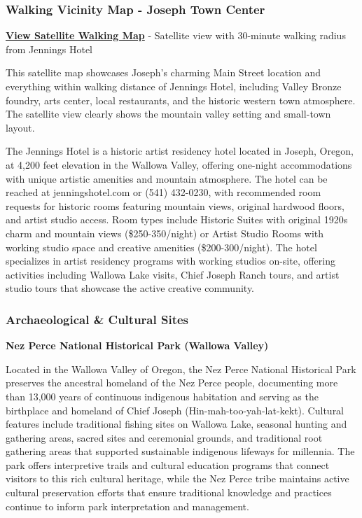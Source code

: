 \documentclass[
  11pt,
  letterpaper,
  DIV=10,
  numbers=noendperiod]{scrartcl}
\begin{document}
\subsubsection{Walking Vicinity Map - Joseph Town
Center}\label{walking-vicinity-map---joseph-town-center}

\textbf{\href{images/joseph_or_walking_map.html}{View Satellite Walking
Map}} - Satellite view with 30-minute walking radius from Jennings Hotel

This satellite map showcases Joseph's charming Main Street location and
everything within walking distance of Jennings Hotel, including Valley
Bronze foundry, arts center, local restaurants, and the historic western
town atmosphere. The satellite view clearly shows the mountain valley
setting and small-town layout.

The Jennings Hotel is a historic artist residency hotel located in
Joseph, Oregon, at 4,200 feet elevation in the Wallowa Valley, offering
one-night accommodations with unique artistic amenities and mountain
atmosphere. The hotel can be reached at jenningshotel.com or (541)
432-0230, with recommended room requests for historic rooms featuring
mountain views, original hardwood floors, and artist studio access. Room
types include Historic Suites with original 1920s charm and mountain
views (\$250-350/night) or Artist Studio Rooms with working studio space
and creative amenities (\$200-300/night). The hotel specializes in
artist residency programs with working studios on-site, offering
activities including Wallowa Lake visits, Chief Joseph Ranch tours, and
artist studio tours that showcase the active creative community.

\subsubsection{Archaeological \& Cultural
Sites}\label{archaeological-cultural-sites-2}

\textbf{Nez Perce National Historical Park (Wallowa Valley)}

Located in the Wallowa Valley of Oregon, the Nez Perce National
Historical Park preserves the ancestral homeland of the Nez Perce
people, documenting more than 13,000 years of continuous indigenous
habitation and serving as the birthplace and homeland of Chief Joseph
(Hin-mah-too-yah-lat-kekt). Cultural features include traditional
fishing sites on Wallowa Lake, seasonal hunting and gathering areas,
sacred sites and ceremonial grounds, and traditional root gathering
areas that supported sustainable indigenous lifeways for millennia. The
park offers interpretive trails and cultural education programs that
connect visitors to this rich cultural heritage, while the Nez Perce
tribe maintains active cultural preservation efforts that ensure
traditional knowledge and practices continue to inform park
interpretation and management.
\end{document}
